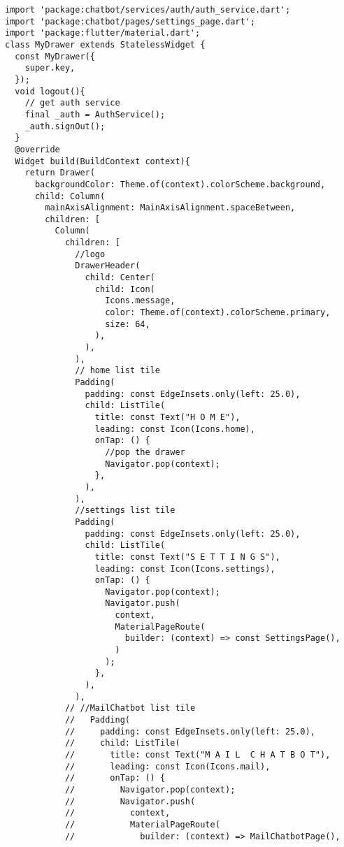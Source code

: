 \begin{lstlisting}[style=pythonstyle,caption={Codice del my\_drawer.dart}, label={lst:drawer}]
import 'package:chatbot/services/auth/auth_service.dart';
import 'package:chatbot/pages/settings_page.dart';
import 'package:flutter/material.dart';
class MyDrawer extends StatelessWidget {
  const MyDrawer({
    super.key,
  });
  void logout(){
    // get auth service
    final _auth = AuthService();
    _auth.signOut();
  }
  @override
  Widget build(BuildContext context){
    return Drawer(
      backgroundColor: Theme.of(context).colorScheme.background,
      child: Column(
        mainAxisAlignment: MainAxisAlignment.spaceBetween,
        children: [
          Column(
            children: [
              //logo
              DrawerHeader(
                child: Center(
                  child: Icon(
                    Icons.message,
                    color: Theme.of(context).colorScheme.primary,
                    size: 64,
                  ),
                ),
              ),
              // home list tile
              Padding(
                padding: const EdgeInsets.only(left: 25.0),
                child: ListTile(
                  title: const Text("H O M E"),
                  leading: const Icon(Icons.home),
                  onTap: () {
                    //pop the drawer
                    Navigator.pop(context);
                  },
                ),
              ),
              //settings list tile
              Padding(
                padding: const EdgeInsets.only(left: 25.0),
                child: ListTile(
                  title: const Text("S E T T I N G S"),
                  leading: const Icon(Icons.settings),
                  onTap: () {
                    Navigator.pop(context);
                    Navigator.push(
                      context,
                      MaterialPageRoute(
                        builder: (context) => const SettingsPage(),
                      )
                    );
                  },
                ),
              ),
            // //MailChatbot list tile
            //   Padding(
            //     padding: const EdgeInsets.only(left: 25.0),
            //     child: ListTile(
            //       title: const Text("M A I L  C H A T B O T"),
            //       leading: const Icon(Icons.mail),
            //       onTap: () {
            //         Navigator.pop(context);
            //         Navigator.push(
            //           context,
            //           MaterialPageRoute(
            //             builder: (context) => MailChatbotPage(),

\end{lstlisting}
